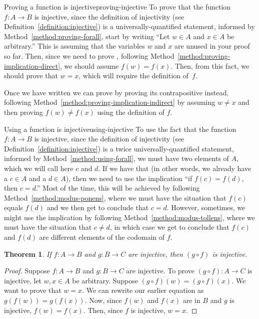 \documentclass{book}
\newcounter{ekcounter}%
\theoremstyle{ekimcustom}
\newtheorem{theorem}[ekcounter]{Theorem}
\begin{document}
\begin{bmethod}{Proving a function is injective}{proving-injective}
To prove that the function $f: A \to B$ is injective, since the definition of injectivity (see Definition~\ref{definition:injective}) is a universally-quantified statement, informed by Method~\ref{method:proving-forall}, start by writing ``Let $w \in A$ and $x \in A$ be arbitrary.'' This is assuming that the variables $w$ and $x$ are unused in your proof so far. Then, since we need to prove , following Method~\ref{method:proving-implication-direct}, we should assume $f(w)=f(x)$. Then, from this fact, we should prove that $w=x$, which will require the definition of~$f$.

Once we have written  we can prove  by proving its contrapositive instead, following Method~\ref{method:proving-implication-indirect} by assuming $w \not= x$ and then proving $f(w)\not=f(x)$ using the definition of $f$.
\end{bmethod}
\begin{bmethod}{Using a function is injective}{using-injective}
To use the fact that the function $f: A \to B$ is injective, since the definition of injectivity (see Definition~\ref{definition:injective}) is a twice universally-quantified statement, informed by Method~\ref{method:using-forall}, we must have two elements of $A$, which we will call here $c$ and $d$. If we have that (in other words, we already have a $c \in A$ and a $d \in A$), then we need to use the implication ``if $f(c)=f(d)$, then $c=d$.'' Most of the time, this will be achieved by following Method~\ref{method:modus-ponens}, where we must have the situation that $f(c)$ equals $f(d)$ and we then get to conclude that $c=d$. However, sometimes, we might use the implication by following Method~\ref{method:modus-tollens}, where we must have the situation that $c \not = d$, in which case we get to conclude that $f(c)$ and $f(d)$ are different elements of the codomain of $f$.
\end{bmethod}
\begin{theorem}
If $f : A \to B$ and $g: B \to C$ are injective, then $(g \circ f)$ is injective.
\end{theorem}
\begin{proof}
Suppose $f : A \to B$ and $g: B \to C$ are injective. To prove $(g \circ f) : A \to C$ is injective, let $w, x \in A$ be arbitrary. Suppose $(g \circ f)(w)= (g \circ f)(x)$. We want to prove that $w=x$. We can rewrite our earlier equation as $g(f(w))=g(f(x))$. Now, since $f(w)$ and $f(x)$ are in $B$ and $g$ is injective, $f(w)=f(x)$. Then, since $f$ is injective, $w=x$.
\end{proof}
\end{document}

